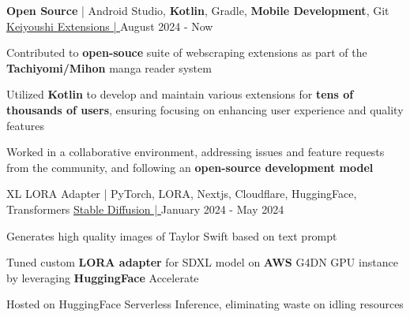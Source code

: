 \begin{cventries}
	\cventry
	{\textbf{Open Source} | Android Studio, \textbf{Kotlin}, Gradle, \textbf{Mobile Development}, Git}
	{\underline{\href{https://github.com/keiyoushi/extensions-source}{Keiyoushi Extensions | \ExternalLink}}}
	{} %
	{August 2024 - Now} %
	{
		\begin{cvitems} %
      \item {Contributed to \textbf{open-souce} suite of webscraping extensions as part of the \textbf{Tachiyomi/Mihon} manga reader system}
      \item {Utilized \textbf{Kotlin} to develop and maintain various extensions for \textbf{tens of thousands of users}, ensuring focusing on enhancing user experience and quality features}
      \item {Worked in a collaborative environment, addressing issues and feature requests from the community, and following an \textbf{open-source development model}}
		\end{cvitems}
	}


	\cventry
	{XL LORA Adapter | PyTorch, LORA, Nextjs, Cloudflare, HuggingFace, Transformers}
	{\underline{\href{https://lefan.ca/projects/stable-diffusion}{Stable Diffusion | \ExternalLink}}} %
	{} %
	{January 2024 - May 2024} %
	{
		\begin{cvitems} %
			\item {Generates high quality images of Taylor Swift based on text prompt}
			\item {Tuned custom \textbf{LORA adapter} for SDXL model on \textbf{AWS} G4DN GPU instance by leveraging \textbf{HuggingFace} Accelerate}
			\item {Hosted on HuggingFace Serverless Inference, eliminating waste on idling resources}
		\end{cvitems}
	}


\end{cventries}
